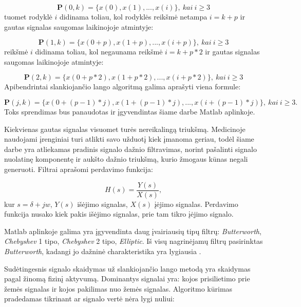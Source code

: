\documentclass[]{vgtuef}
\begin{document}
\begin{equation}
\mathbf{P}(0,k) = \{ x(0), x(1), ..., x(i) \}, ~ kai~i \geq 3
\end{equation}
tuomet rodyklė $i$ didinama toliau, kol rodyklės reikšmė netampa $i=k+p$ ir gautas signalas saugomas laikinojoje atmintyje:

\begin{equation}
\mathbf{P}(1,k) = \{ x(0+p), x(1+p), ..., x(i+p) \}, ~ kai~i \geq 3
\end{equation}
reikšmė $i$ didinama toliau, kol negaunama reikšmė $i=k+p*2$ ir gautas signalas saugomas laikinojoje atmintyje:

\begin{equation}
\mathbf{P}(2,k) = \{ x(0+p*2),x(1+p*2),...,x(i+p*2) \}, ~ kai~i \geq 3
\end{equation}
Apibendrintai slankiojančio lango algoritmą galima aprašyti viena formule:

\begin{equation}
\mathbf{P}(j,k) = \{ x(0+(p-1)*j), x(1+(p-1)*j), ..., x(i+(p-1)*j)  \}, ~ kai~i \geq 3.
\end{equation}
Toks sprendimas bus panaudotas ir įgyvendintas šiame darbe Matlab aplinkoje.


Kiekvienas gautas signalas visuomet turės nereikalingą triukšmą. Medicinoje naudojami įrenginiai turi atlikti savo užduotį kiek įmanoma geriau, todėl šiame darbe yra atliekamas pradinis signalo dažnio filtravimas, norint pašalinti signalo nuolatinę komponentę ir aukšto dažnio triukšmą, kurio žmogaus kūnas negali generuoti. Filtrai aprašomi perdavimo funkcija:

\begin{equation}
H(s) = \frac{Y(s)}{X(s)},
\end{equation}
kur $s=\delta + jw$, $Y(s)$ išėjimo signalas, $X(s)$ įėjimo signalas. Perdavimo funkcija nusako kiek pakis išėjimo signalas, prie tam tikro įėjimo signalo. 

Matlab aplinkoje galima yra įgyvendinta daug įvairiausių tipų filtrų: \textit{Butterworth}, \textit{Chebyshev} 1 tipo, \textit{Chebyshev} 2 tipo, \textit{Elliptic}. Iš visų nagrinėjamų filtrų pasirinktas \textit{Butterworth}, kadangi jo dažninė charakteristika yra lygiausia \cite{wiki_filters}.


Sudėtingesnis signalo skaidymas už slankiojančio lango metodą yra skaidymas pagal žinomą fizinį aktyvumą. Dominantys signalai yra: kojos prisilietimo prie žemės signalas ir kojos pakilimas nuo žemės signalas. Algoritmo kūrimas pradedamas tikrinant ar signalo vertė nėra lygi nuliui:
\end{document}
